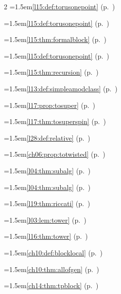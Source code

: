 \begin{multicols}{2}
\hangindent=1.5em\quad \ref{l15:def:torusonepoint} (p.~\pageref{l15:def:torusonepoint})\par
\hangindent=1.5em\quad \ref{l15:def:torusonepoint} (p.~\pageref{l15:def:torusonepoint})\par
\hangindent=1.5em\quad \ref{l15:thm:formalblock} (p.~\pageref{l15:thm:formalblock})\par
\hangindent=1.5em\quad \ref{l15:def:torusonepoint} (p.~\pageref{l15:def:torusonepoint})\par
\hangindent=1.5em\quad \ref{l15:thm:recursion} (p.~\pageref{l15:thm:recursion})\par
\hangindent=1.5em\quad \ref{l13:def:simpleamodclass} (p.~\pageref{l13:def:simpleamodclass})\par
\hangindent=1.5em\quad \ref{l17:prop:tosuper} (p.~\pageref{l17:prop:tosuper})\par
\hangindent=1.5em\quad \ref{l17:thm:tosuperspin} (p.~\pageref{l17:thm:tosuperspin})\par
\hangindent=1.5em\quad \ref{l28:def:relative} (p.~\pageref{l28:def:relative})\par
\hangindent=1.5em\quad \ref{ch06:prop:totwisted} (p.~\pageref{ch06:prop:totwisted})\par
\hangindent=1.5em\quad \ref{l04:thm:subalg} (p.~\pageref{l04:thm:subalg})\par
\hangindent=1.5em\quad \ref{l04:thm:subalg} (p.~\pageref{l04:thm:subalg})\par
\hangindent=1.5em\quad \ref{l19:thm:riccati} (p.~\pageref{l19:thm:riccati})\par
\hangindent=1.5em\quad \ref{l03:lem:tower} (p.~\pageref{l03:lem:tower})\par
\hangindent=1.5em\quad \ref{l16:thm:tower} (p.~\pageref{l16:thm:tower})\par
\hangindent=1.5em\quad \ref{ch10:def:blocklocal} (p.~\pageref{ch10:def:blocklocal})\par
\hangindent=1.5em\quad \ref{ch10:thm:allofgen} (p.~\pageref{ch10:thm:allofgen})\par
\hangindent=1.5em\quad \ref{ch14:thm:tpblock} (p.~\pageref{ch14:thm:tpblock})\par

\end{multicols}
